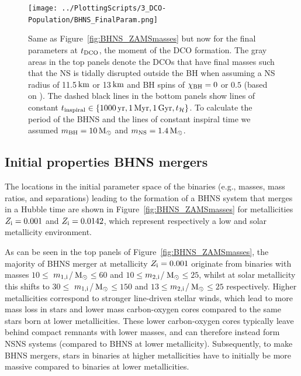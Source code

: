 \documentclass[twocolumn]{aastex63}
\newcommand\bhnsSingle{BHNS\xspace}
\newcommand{\monei}{\ensuremath{m_{1,\rm{i}}}\xspace}
\newcommand{\mtwoi}{\ensuremath{m_{2,\rm{i}}}\xspace}
\newcommand{\Zi}{\ensuremath{Z_{\rm{i}}}\xspace}
\newcommand{\km}{\ensuremath{\,\rm{km}}\xspace}
\newcommand{\Msun}{\ensuremath{\,\rm{M}_{\odot}}\xspace}
\newcommand{\Myr}{\ensuremath{\,\mathrm{Myr}}\xspace}
\newcommand{\yrs}{\ensuremath{\,\mathrm{yr}}\xspace}
\newcommand{\Gyr}{\ensuremath{\,\mathrm{Gyr}}\xspace}
\newcommand{\tDCO}{\ensuremath{{t}_{\rm{DCO}}}\xspace}
\newcommand{\tinspiral}{\ensuremath{{t}_{\rm{inspiral}}}\xspace}
\newcommand{\thubble}{\ensuremath{{t}_{\mathcal{H}}}\xspace}
\newcommand{\mnsf}{\ensuremath{m_{\rm{NS}}}\xspace}
\newcommand{\mbhf}{\ensuremath{m_{\rm{BH}}}\xspace}
\newcommand{\chibh}{\ensuremath{{\chi}_{\rm{BH}}}\xspace}
\begin{document}
\begin{figure}
%
\texttt{[image: ../PlottingScripts/3\_DCO-Population/BHNS\_FinalParam.png]}
%
   \caption{Same as Figure~\ref{fig:BHNS_ZAMSmasses} but now for the final parameters  at \tDCO, the moment of the \ac{DCO} formation.  
   The gray areas  in the top panels denote the \ac{DCO}s that have final masses such that the \ac{NS} is tidally disrupted  outside the  \ac{BH} when assuming a \ac{NS} radius of 11.5\km or 13\km and  \ac{BH} spins of  $\chibh = 0$ or $0.5$ (based on  \citealt[][]{2018PhRvD..98h1501F}). 
   The dashed black lines in the bottom panels show lines of constant $\tinspiral \in \{ 1000\yrs, 1\Myr, 1\Gyr,  \thubble \}$. 
   To calculate the period of the \bhnsSingle and the lines of constant inspiral time we assumed $\mbhf=10\Msun$ and  $\mnsf=1.4\Msun$.  } %
%
  \label{fig:BHNS_DCOmasses}
\end{figure}
%




%
\subsection{Initial properties \bhnsSingle mergers}
\label{subsec:bhns-BPS-ZAMSm1m2}
%

The locations  in the initial parameter space of the binaries (e.g.,  masses, mass ratios, and separations)  leading to the formation of a \bhnsSingle system that merges in a Hubble time are shown in Figure~\ref{fig:BHNS_ZAMSmasses}  for metallicities $\Zi=0.001$ and $\Zi=0.0142$, which represent respectively a low and solar \citep{2009ARA&A..47..481A} metallicity environment. 

As can be seen in the top panels of Figure~\ref{fig:BHNS_ZAMSmasses},  the majority of \bhnsSingle merger at metallicity $\Zi=0.001$ originate from binaries with  masses  $10 \leq $ \monei/\Msun $\leq 60$ and   $10 \leq $\mtwoi/\Msun $\leq 25$, whilst at solar metallicity this shifts to  $30 \leq $ \monei/\Msun $\leq 150$ and $13 \leq $\mtwoi/\Msun $\leq 25$ respectively. Higher metallicities correspond to stronger line-driven stellar winds, which lead to more mass loss in stars and lower mass carbon-oxygen cores compared to the same stars born at lower metallicities. These lower carbon-oxygen cores typically leave behind compact remnants with lower masses, and can therefore instead form \ac{NSNS} systems (compared to \bhnsSingle at lower metallicity). Subsequently, to make \bhnsSingle mergers, stars in  binaries at higher metallicities have to initially be more massive compared to binaries at lower metallicities. 
\end{document}
